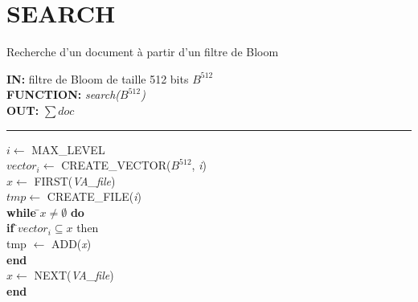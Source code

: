 \newpage
\section{SEARCH}
\begin{algorithme}
	Recherche d'un document à partir d'un filtre de Bloom
\end{algorithme}

\begin{flushleft}
	\begin{framed}
		\textbf{IN:} filtre de Bloom de taille 512 bits $B^{512}$\\
		\textbf{FUNCTION:} \textit{search($B^{512}$)}\\
		\textbf{OUT:} \textit{$\sum doc$}\\

		\noindent\rule{\linewidth}{0.5pt}

		\begin{tabbing}
			$i \leftarrow$ MAX\_LEVEL\\
			$vector_i \leftarrow$ CREATE\_VECTOR($B^{512}$, \textit{i})\\
			$x \leftarrow$ FIRST(\textit{VA\_file})\\
			$tmp \leftarrow$ CREATE\_FILE(\textit{i})\\
			
			\textbf{while }\=$x \neq \emptyset $ \textbf{do}\\
					\> \textbf{if }\=$vector_i \subseteq x$ {then}\\
						\>\> tmp $\leftarrow$ ADD(\textit{x})\\
					\> \textbf{end}\\
					\> $x \leftarrow$ NEXT(\textit{VA\_file})\\
			\textbf{end}\\
			

\end{tabbing}
\end{framed}
\end{flushleft}
